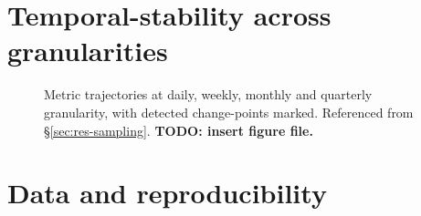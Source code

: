 \documentclass[logo,msc]{infthesis}           %
\begin{document}

\section{Temporal-stability across granularities}
\label{app:stability}
\begin{figure}[h]
  \centering
  \caption{Metric trajectories at daily, weekly, monthly and quarterly
  granularity, with detected change-points marked. Referenced from
  \S\ref{sec:res-sampling}. \textbf{TODO: insert figure file.}}
  \label{fig:stability-granularity}
\end{figure}

\section{Data and reproducibility}
\label{app:repro}
%
\end{document}

